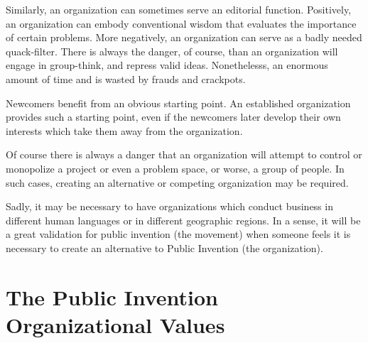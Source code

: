 \documentclass[
	fontsize=10pt, %
	twoside=false, %
	secnumdepth=1, %
]{kaobook}
\begin{document}
Similarly, an organization can sometimes serve an editorial function.
Positively, an organization can embody conventional wisdom that
evaluates the importance of certain problems.
More negatively, an organization can serve as a badly needed quack-filter.
There is always the danger, of course, than an organization will engage in group-think,
and repress valid ideas.
Nonethelesss, an enormous amount of time and is wasted by frauds and crackpots.

Newcomers benefit from an obvious starting point.
An established organization provides such a starting point, even if the newcomers
later develop their own interests which take them away from the organization.

Of course there is always a danger that an organization will attempt to control or monopolize
a project or even a problem space, or worse, a group of people.
In such cases, creating an alternative or competing organization
may be required.

Sadly, it may be necessary to have organizations which conduct business in
different human languages or in different geographic regions.
In a sense, it will be a great validation for public invention (the movement) when
someone feels it is necessary to create an alternative to Public Invention (the organization).

\chapter{The Public Invention Organizational Values}
\end{document}
